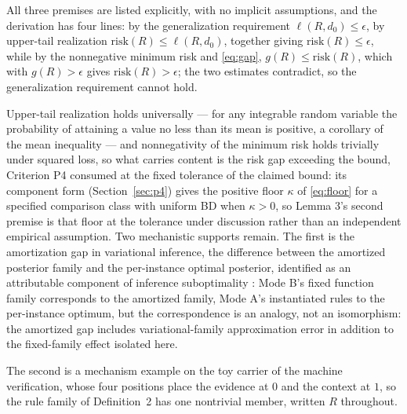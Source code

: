 \argument All three premises are listed explicitly, with no implicit assumptions, and the derivation has four lines: by the generalization requirement $\ell(R, d_0) \le \epsilon$, by upper-tail realization $\mathrm{risk}(R) \le \ell(R, d_0)$, together giving $\mathrm{risk}(R) \le \epsilon$, while by the nonnegative minimum risk and \eqref{eq:gap}, $g(R) \le \mathrm{risk}(R)$, which with $g(R) > \epsilon$ gives $\mathrm{risk}(R) > \epsilon$; the two estimates contradict, so the generalization requirement cannot hold.\qedbox

Upper-tail realization holds universally --- for any integrable random variable the probability of attaining a value no less than its mean is positive, a corollary of the mean inequality --- and nonnegativity of the minimum risk holds trivially under squared loss, so what carries content is the risk gap exceeding the bound, Criterion P4 consumed at the fixed tolerance of the claimed bound: its component form (Section~\ref{sec:p4}) gives the positive floor $\kappa$ of \eqref{eq:floor} for a specified comparison class with uniform BD when $\kappa>0$, so Lemma 3's second premise is that floor at the tolerance under discussion rather than an independent empirical assumption. Two mechanistic supports remain. The first is the amortization gap in variational inference, the difference between the amortized posterior family and the per-instance optimal posterior, identified as an attributable component of inference suboptimality \citep{cremer2018}: Mode B's fixed function family corresponds to the amortized family, Mode A's instantiated rules to the per-instance optimum, but the correspondence is an analogy, not an isomorphism: the amortized gap includes variational-family approximation error in addition to the fixed-family effect isolated here.

The second is a mechanism example on the toy carrier of the machine verification, whose four positions place the evidence at $0$ and the context at $1$, so the rule family of Definition~2 has one nontrivial member, written $R$ throughout.

